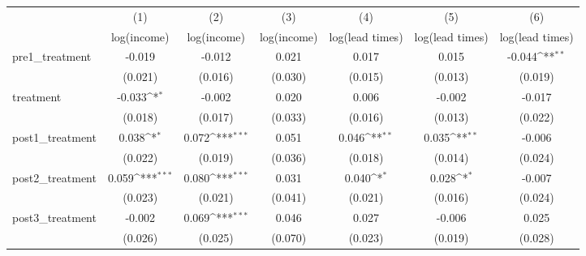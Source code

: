 {
\def\sym#1{\ifmmode^{#1}\else\(^{#1}\)\fi}
\begin{adjustbox}{max width=\textwidth}
\begin{tabular}{l*{6}{c}}
\toprule
            &\multicolumn{1}{c}{(1)}&\multicolumn{1}{c}{(2)}&\multicolumn{1}{c}{(3)}&\multicolumn{1}{c}{(4)}&\multicolumn{1}{c}{(5)}&\multicolumn{1}{c}{(6)}\\
            &\multicolumn{1}{c}{log(income)}&\multicolumn{1}{c}{log(income)}&\multicolumn{1}{c}{log(income)}&\multicolumn{1}{c}{log(lead times)}&\multicolumn{1}{c}{log(lead times)}&\multicolumn{1}{c}{log(lead times)}\\
\midrule
pre1\_treatment&      -0.019         &      -0.012         &       0.021         &       0.017         &       0.015         &      -0.044\sym{**} \\
            &     (0.021)         &     (0.016)         &     (0.030)         &     (0.015)         &     (0.013)         &     (0.019)         \\
\addlinespace
treatment   &      -0.033\sym{*}  &      -0.002         &       0.020         &       0.006         &      -0.002         &      -0.017         \\
            &     (0.018)         &     (0.017)         &     (0.033)         &     (0.016)         &     (0.013)         &     (0.022)         \\
\addlinespace
post1\_treatment&       0.038\sym{*}  &       0.072\sym{***}&       0.051         &       0.046\sym{**} &       0.035\sym{**} &      -0.006         \\
            &     (0.022)         &     (0.019)         &     (0.036)         &     (0.018)         &     (0.014)         &     (0.024)         \\
\addlinespace
post2\_treatment&       0.059\sym{***}&       0.080\sym{***}&       0.031         &       0.040\sym{*}  &       0.028\sym{*}  &      -0.007         \\
            &     (0.023)         &     (0.021)         &     (0.041)         &     (0.021)         &     (0.016)         &     (0.024)         \\
\addlinespace
post3\_treatment&      -0.002         &       0.069\sym{***}&       0.046         &       0.027         &      -0.006         &       0.025         \\
            &     (0.026)         &     (0.025)         &     (0.070)         &     (0.023)         &     (0.019)         &     (0.028)         \\

\end{tabular}
\end{adjustbox}}
